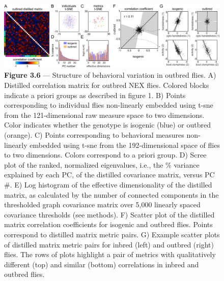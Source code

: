 \documentclass[12pt,letterpaper]{article}
\begin{document}
\begin{figure}[t!]
    \includegraphics[width=\textwidth]{../figures/chapter_3/fig_3-6.pdf}
    \vspace{.05in}
    \caption*{\textbf{Figure 3.6} — Structure of behavioral variation in outbred flies. A) Distilled correlation matrix for outbred NEX flies. Colored blocks indicate a priori groups as described in figure 1. B) Points corresponding to individual flies non-linearly embedded using t-sne from the 121-dimensional raw measure space to two dimensions. Color indicates whether the genotype is isogenic (blue) or outbred (orange). C) Points corresponding to behavioral measures non-linearly embedded using t-sne from the 192-dimensional space of flies to two dimensions. Colors correspond to a priori group. D) Scree plot of the ranked, normalized eigenvalues, i.e., the \% variance explained by each PC, of the distilled covariance matrix, versus PC #. E) Log histogram of the effective dimensionality of the distilled matrix, as calculated by the number of connected components in the thresholded graph covariance matrix over 5,000 linearly spaced covariance thresholds (see methods). F) Scatter plot of the distilled matrix correlation coefficients for isogenic and outbred flies. Points correspond to distilled matrix metric pairs. G) Example scatter plots of distilled matrix metric pairs for inbred (left) and outbred (right) flies. The rows of plots highlight a pair of metrics with qualitatively different (top) and similar (bottom) correlations in inbred and outbred flies.}
\end{figure}
\end{document}

